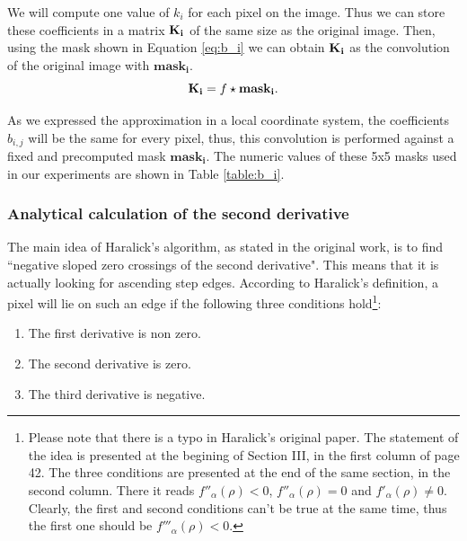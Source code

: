 \documentclass{ipol}
\numberwithin{equation}{section}
\numberwithin{table}{section}
\begin{document}
\vspace{1ex}
We will compute one value of $k_i$ for each pixel on the image. Thus we can store these coefficients in a matrix $\bf{K_i}$ of the same size as the original image. Then, using the mask shown in Equation \ref{eq:b_i} we can obtain $\bf{K_i}$ as the convolution of the original image with $\mathbf{mask_i}$. \\
\begin{equation}
	\label{eq:convolution_b}
	\mathbf{K_i} = f \star \mathbf{mask_i}.\\
\end{equation}

As we expressed the approximation in a local coordinate system, the coefficients $b_{i,j}$ will be the same for every pixel, thus, this convolution is performed against a fixed and precomputed mask $\mathbf{mask_i}$. The numeric values of these 5x5 masks used in our experiments are shown in Table \ref{table:b_i}.




\subsubsection{Analytical calculation of the second derivative}
\label{sec:secderivative}

The main idea of Haralick's algorithm, as stated in the original work, is to find ``negative sloped zero crossings of the second derivative". This means that it is actually looking for ascending step edges. According to Haralick's definition, a pixel will lie on such an edge if the following three conditions hold\footnote{Please note that there is a typo in Haralick's original paper. The statement of the idea is presented at the begining of Section III, in the first column of page 42. The three conditions are presented at the end of the same section, in the second column. There it reads $f''_{\alpha}(\rho)<0$, $f''_{\alpha}(\rho)=0$ and $f'_{\alpha}(\rho)\neq 0$. Clearly, the first and second conditions can't be true at the same time, thus the first one should be $f'''_{\alpha}(\rho)<0$.}:

\begin{enumerate}
\item The first derivative is non zero.
\item The second derivative is zero.
\item The third derivative is negative.
\end{enumerate}
\end{document}
